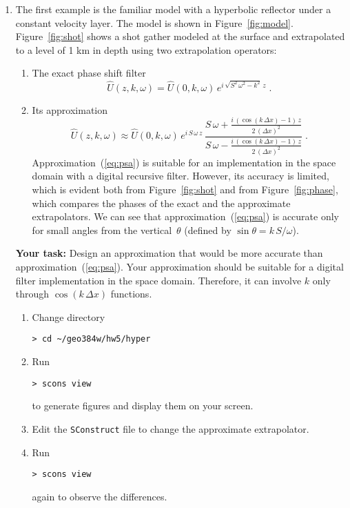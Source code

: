 \begin{enumerate}

\item The first example is the familiar model with a hyperbolic
  reflector under a constant velocity layer.  The model is shown in
  Figure~\ref{fig:model}. Figure~\ref{fig:shot} shows a shot gather
  modeled at the surface and extrapolated to a level of 1 km in depth
  using two extrapolation operators: 
  \begin{enumerate}
  \item The exact phase shift filter
    \begin{equation}
      \label{eq:ps}
      \hat{U}(z,k,\omega) = \hat{U}(0,k,\omega)\,e^{i\,\sqrt{S^2\,\omega^2 - k^2}\,z}\;.
    \end{equation}
  \item Its approximation
    \begin{equation}
      \label{eq:psa}
      \hat{U}(z,k,\omega) \approx \hat{U}(0,k,\omega)\,
      e^{i\,S\,\omega\,z}\,
      \frac
      {\displaystyle S\,\omega + \frac{i\,\left(\cos{(k\,\Delta x)}-1\right)\,z}{2\,(\Delta x)^2}}
      {\displaystyle S\,\omega - \frac{i\,\left(\cos{(k\,\Delta x)}-1\right)\,z}{2\,(\Delta x)^2}}\;.
    \end{equation}
    Approximation~(\ref{eq:psa}) is suitable for an implementation in the space domain
    with a digital recursive filter. However, its accuracy is limited,
    which is evident both from Figure~\ref{fig:shot} and from
    Figure~\ref{fig:phase}, which compares the phases of the exact and
    the approximate extrapolators. We can see that
    approximation~(\ref{eq:psa}) is accurate only for small angles
    from the vertical~$\theta$ (defined by $\sin{\theta} = k\,S/\omega$). 
  \end{enumerate}

  \textbf{Your task:} Design an approximation that would be more accurate
    than approximation~(\ref{eq:psa}). Your approximation should be
    suitable for a digital filter implementation in the space
    domain. Therefore, it can involve $k$ only through $\cos{(k\,\Delta
      x)}$ functions.
    \begin{enumerate}
    \item Change directory 
\begin{verbatim}
> cd ~/geo384w/hw5/hyper
\end{verbatim}
    \item Run
\begin{verbatim}
> scons view
\end{verbatim}
      to generate figures and display them on your screen.  
    \item Edit the \texttt{SConstruct} file to change the approximate extrapolator.
    \item Run
\begin{verbatim}
> scons view
\end{verbatim}
      again to observe the differences.
    \end{enumerate}


\end{enumerate}
